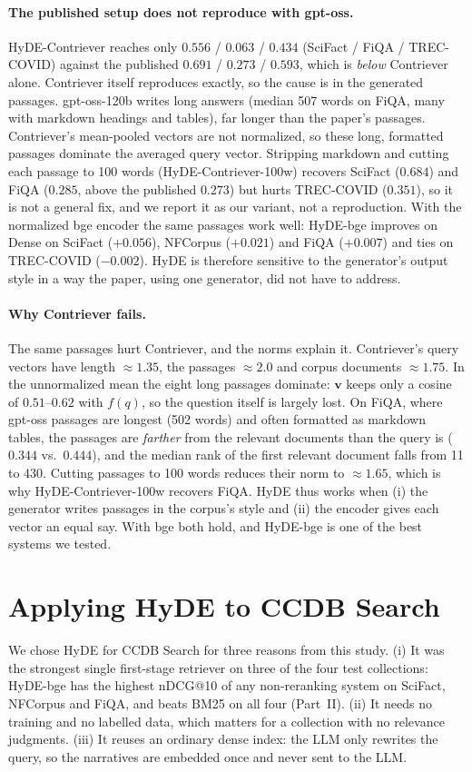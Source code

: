 \documentclass[11pt]{article}
\begin{document}
\paragraph{The published setup does not reproduce with gpt-oss.}\label{sec:hyde}
HyDE-Contriever reaches only $0.556$ / $0.063$ / $0.434$ (SciFact / FiQA / TREC-COVID) against the
published $0.691$ / $0.273$ / $0.593$, which is \emph{below} Contriever alone. Contriever itself
reproduces exactly, so the cause is in the generated passages. gpt-oss-120b writes long answers
(median 507 words on FiQA, many with markdown headings and tables), far longer than the paper's
passages. Contriever's mean-pooled vectors are not normalized, so these long, formatted passages
dominate the averaged query vector. Stripping markdown and cutting each passage to 100 words
(HyDE-Contriever-100w) recovers SciFact ($0.684$) and FiQA ($0.285$, above the published $0.273$) but
hurts TREC-COVID ($0.351$), so it is not a general fix, and we report it as our variant, not a
reproduction. With the normalized bge encoder the same passages work well: HyDE-bge improves on Dense
on SciFact ($+0.056$), NFCorpus ($+0.021$) and FiQA ($+0.007$) and ties on TREC-COVID ($-0.002$). HyDE
is therefore sensitive to the generator's output style in a way the paper, using one generator, did
not have to address.

\paragraph{Why Contriever fails.} The same passages hurt Contriever, and the norms explain it.
Contriever's query vectors have length $\approx1.35$, the passages $\approx2.0$ and corpus
documents $\approx1.75$. In the unnormalized mean the eight long passages dominate: $\mathbf v$
keeps only a cosine of $0.51$--$0.62$ with $f(q)$, so the question itself is largely lost. On FiQA,
where gpt-oss passages are longest (502 words) and often formatted as markdown tables, the passages
are \emph{farther} from the relevant documents than the query is ($0.344$ vs.\ $0.444$), and the
median rank of the first relevant document falls from 11 to 430. Cutting passages to 100 words
reduces their norm to $\approx1.65$, which is why HyDE-Contriever-100w recovers FiQA. HyDE thus
works when (i) the generator writes passages in the corpus's style and (ii) the encoder gives
each vector an equal say. With bge both hold, and HyDE-bge is one of the best systems we tested.


\section{Applying HyDE to CCDB Search}\label{sec:ccdb}\label{sec:hydeccdb}
We chose HyDE for CCDB Search for three reasons from this study. (i) It was the strongest single
first-stage retriever on three of the four test collections: HyDE-bge has the highest nDCG@10 of any
non-reranking system on SciFact, NFCorpus and FiQA, and beats BM25 on all four (Part~II). (ii) It
needs no training and no labelled data, which matters for a collection with no relevance
judgments. (iii) It reuses an ordinary dense index: the LLM only rewrites the query, so the
narratives are embedded once and never sent to the LLM.
\end{document}
